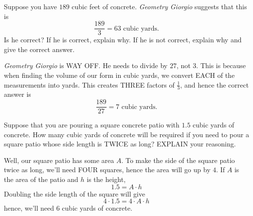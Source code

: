 \documentclass[handout,nooutcomes,noauthor]{ximera}
\begin{document}
\begin{question}
  Suppose you have $189$ cubic feet of concrete. \textit{Geometry
    Giorgio} suggests that this is
  \[
  \frac{189}{3} = 63 \text{ cubic yards}.
  \]
  Is he correct? If he is correct, explain why. If he is not correct,
  explain why and give the correct answer.
  \begin{freeResponse}
     \textit{Geometry Giorgio} is WAY OFF. He needs to divide by $27$,
     not $3$. This is because when finding the volume of our form in
     cubic yards, we convert EACH of the measurements into yards. This
     creates THREE factors of $\frac{1}{3}$, and hence the correct
     answer is
     \[
     \frac{189}{27} = 7 \text{ cubic yards}.
     \]
  \end{freeResponse}
\end{question}
\mynewpage


\begin{question}
  Suppose that you are pouring a square concrete patio with $1.5$
  cubic yards of concrete. How many cubic yards of concrete will be
  required if you need to pour a square patio whose side length is
  TWICE as long?  EXPLAIN your reasoning.
  \begin{freeResponse}
    Well, our square patio has some area $A$. To make the side of the
    square patio twice as long, we'll need FOUR squares, hence the
    area will go up by $4$. If $A$ is the area of the patio and $h$ is the height, 
    \[
    1.5 = A \cdot h
    \]
    Doubling the side length of the square will give
    \[
    4\cdot 1.5 = 4\cdot A \cdot h
    \]
    hence, we'll need $6$ cubic yards of concrete.
  \end{freeResponse}
\end{question}
\end{document}
